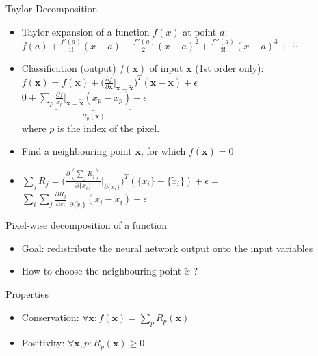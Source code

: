 \documentclass{beamer}
\begin{document}
\begin{frame}{Taylor Decomposition}

\begin{itemize}
  \item Taylor expansion of a function $f(x)$ at point $a$: \\
  $f(a) + \frac{f'(a)}{1!}(x-a) + \frac{f''(a)}{2!}(x-a)^2 + \frac{f'''(a)}{3!}(x-a)^3 + \cdots$
\end{itemize}

\begin{itemize}
  \item Classification (output) $f(\mathbf{x})$ of input $\mathbf{x}$ (1st order only): \\
  $f(\mathbf{x}) = f(\tilde{\mathbf{x}}) + \Bigg( \frac{\partial f}{\partial \mathbf{x}} \biggr\rvert_{\mathbf{x} = \tilde{\mathbf{x}}} \Bigg)^T
  (\mathbf{x} - \tilde{\mathbf{x}}) + \epsilon $ \\
  $0 + \sum_p \underbrace{\frac{\partial f}{x_p} \biggr\rvert_{\mathbf{x} = \tilde{\mathbf{x}}} (x_p - \tilde{x}_p)}_\text{$R_p(\mathbf{x})$} + \epsilon  $ \\
  where $p$ is the index of the pixel.
  \item Find a neighbouring point $\tilde{\mathbf{x}}$, for which $f(\tilde{\mathbf{x}}) = 0$ 
  \item $\sum_j R_j = \Bigg( \frac{\partial (\sum_j R_j)}{\partial{\{x_i\}}}\biggr\rvert_{\partial \{\tilde{x}_i\} } \Bigg)^T (\{x_i\} - \{\tilde{x}_i\}) + \epsilon = $ \\ $\sum_i \sum_j \frac{\partial R_j}{\partial x_i}\biggr\rvert_{\partial \{\tilde{x}_i\} } (x_i - \tilde{x}_i) + \epsilon $
\end{itemize}

\end{frame}

\begin{frame}{Pixel-wise decomposition of a function}

\begin{itemize}
  \item Goal: redistribute the neural network output onto the input variables
  \item How to choose the neighbouring point $\tilde{x}$ ?
\end{itemize}

\end{frame}
\begin{frame}{Properties}

\begin{itemize}
  \item Conservation: $\forall \mathbf{x}: f(\mathbf{x}) = \sum_p R_p(\mathbf{x})$
  \item Positivity: $\forall \mathbf{x}, p: R_p(\mathbf{x}) \geq 0$
\end{itemize}

\end{frame}
\end{document}
